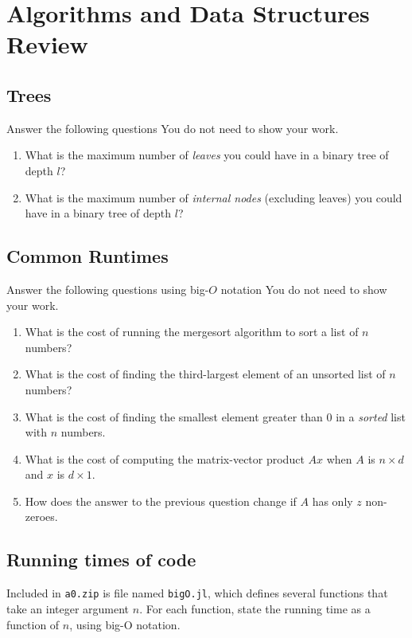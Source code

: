 \documentclass{article}
\def\blu#1{{\color{blu}#1}}
\begin{document}
\section{Algorithms and Data Structures Review}

\subsection{Trees}

\blu{Answer the following questions} You do not need to show your work.
\begin{enumerate}
\item What is the maximum number of \emph{leaves} you could have in a binary tree of depth $l$?
\item What is the maximum number of \emph{internal nodes} (excluding leaves) you could have in a binary tree of depth $l$?
\end{enumerate}

\subsection{Common Runtimes}

\blu{Answer the following questions using big-$O$ notation} You do not need to show your work.
\begin{enumerate}
\item What is the cost of running the mergesort algorithm to sort  a list of $n$ numbers?
\item What is the cost of finding the third-largest element of an unsorted list of $n$ numbers?
\item What is the cost of finding the smallest element greater than 0 in a \emph{sorted} list with $n$ numbers.
\item What is the cost of computing the matrix-vector product $Ax$ when $A$ is $n \times d$ and $x$ is $d \times 1$.
\item How does the answer to the previous question change if $A$ has only $z$ non-zeroes.
\end{enumerate}

\subsection{Running times of code}

Included in \texttt{a0.zip} is file named \texttt{bigO.jl}, which defines several functions
that take an integer argument $n$. For each function, \blu{state the running time as a function of $n$, using big-O notation}.
\end{document}
